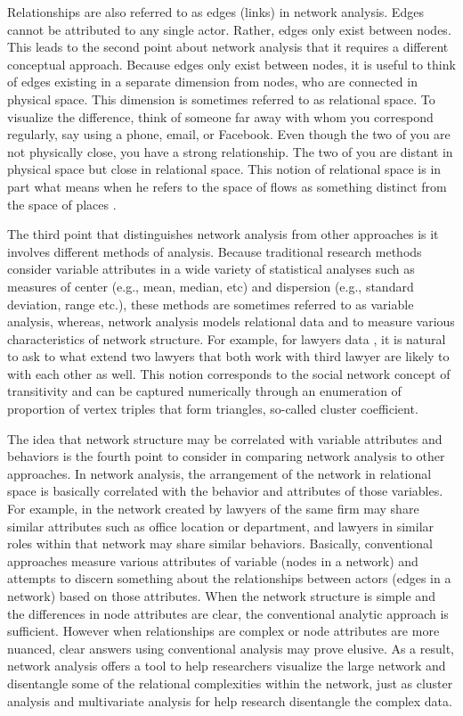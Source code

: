 Relationships are also referred to as edges (links) in network analysis. Edges cannot be attributed to any single actor. Rather, edges only exist between nodes. This leads to the second point about network analysis that it requires a different conceptual approach. Because edges only exist between nodes, it is useful to think of edges existing in a separate dimension from nodes, who are connected in physical space. This dimension is sometimes referred to as relational space. To visualize the difference, think of someone far away with whom you correspond regularly, say using a phone, email, or Facebook. Even though the two of you are not physically close, you have a strong relationship. The two of you are distant in physical space but close in relational space. This notion of relational space is in part what means when he refers to the space of flows as something distinct from the space of places .

The third point that distinguishes network analysis from other approaches is it involves different methods of analysis. Because traditional research methods consider variable attributes in a wide variety of statistical analyses such as measures of center (e.g., mean, median, etc) and dispersion (e.g., standard deviation, range etc.), these methods are sometimes referred to as variable analysis, whereas, network analysis models relational data and to measure various characteristics of network structure. For example, for lawyers data , it is natural to ask to what extend two lawyers that both work with third lawyer are likely to with  each other as well. This notion corresponds to the social network concept of transitivity and can be captured numerically through an enumeration of proportion of vertex triples that form triangles, so-called cluster coefficient. 

The idea that network structure may be correlated with variable attributes and behaviors is the fourth point to consider in comparing network analysis to other approaches. In network analysis, the arrangement of the network in relational space is basically correlated with the behavior and attributes of those variables. For example, in the network created by  lawyers of the same firm may share similar attributes such as office location or department, and lawyers in similar roles within that network may share similar behaviors. Basically, conventional approaches measure various attributes of variable (nodes in a network) and attempts to discern something about the relationships between actors (edges in a network) based on those attributes. When the network structure is simple and the differences in node attributes are clear, the conventional analytic approach is sufficient. However when relationships are complex or node attributes are more nuanced, clear answers using conventional analysis may prove elusive. As a result, network analysis offers a tool to help researchers visualize the large network and disentangle some of the relational complexities within the network, just as cluster analysis and multivariate analysis for help research disentangle the complex data.

